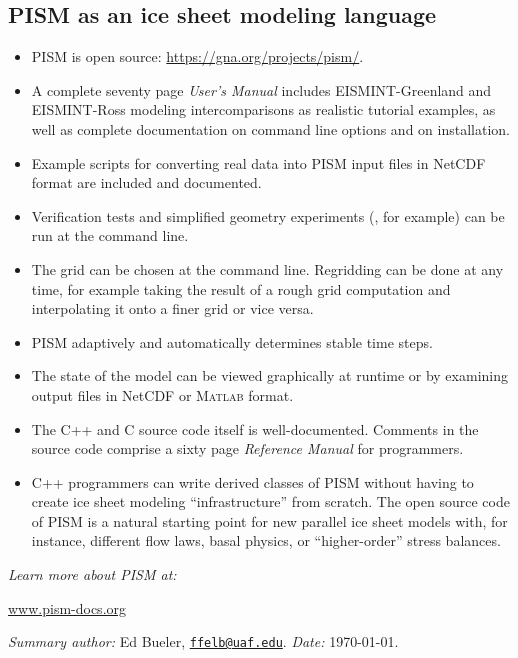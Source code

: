 \documentclass[12pt,final]{amsart}
\newcommand{\Matlab}{\textsc{Matlab}\xspace}
\begin{document}
\subsection*{PISM as an ice sheet modeling language}  \begin{itemize}
\item PISM is open source: \url{https://gna.org/projects/pism/}.
\item A complete seventy page \emph{User's Manual} includes EISMINT-Greenland \citep{RitzEISMINT} and EISMINT-Ross \citep{MacAyealetal} modeling intercomparisons as realistic tutorial examples, as well as complete documentation on command line options and on installation.
\item Example scripts for converting real data into PISM input files in NetCDF format are included and documented.
\item Verification tests and simplified geometry experiments (\citep{EISMINT00}, for example) can be run at the command line.
\item The grid can be chosen at the command line.  Regridding can be done at any time, for example taking the result of a rough grid computation and interpolating it onto a finer grid or vice versa.
\item PISM adaptively and automatically determines stable time steps.
\item The state of the model can be viewed graphically at runtime or by examining output files in NetCDF or \Matlab format.
\item The C++ and C source code itself is well-documented.  Comments in the source code comprise a sixty page \emph{Reference Manual} for programmers.  
\item C++ programmers can write derived classes of PISM without having to create ice sheet modeling ``infrastructure'' from scratch.  The open source code of PISM is a natural starting point for new parallel ice sheet models with, for instance, different flow laws, basal physics, or ``higher-order'' stress balances.
\end{itemize}

\small

%

\normalsize

\vfill
\noindent\emph{Learn more about PISM at:}
\bigskip

\centerline{\href{http://www.pism-docs.org/}{www.pism-docs.org}}
\vfill
\scriptsize
\noindent \emph{Summary author:} Ed Bueler, \href{mailto:ffelb@uaf.edu}{\texttt{ffelb@uaf.edu}}.  \hfill \emph{Date:} \today.
\end{document}
